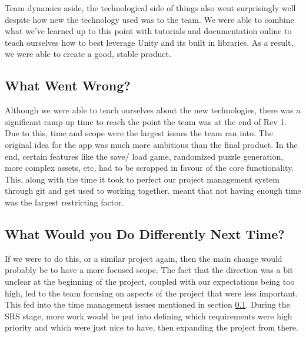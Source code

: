 \documentclass{article}
\begin{document}
Team dynamics aside, the technological side of things also went surprisingly well despite how new the technology used was to the team. We were able to combine what we've learned up to this point with tutorials and documentation online to teach ourselves how to best leverage Unity and its built in libraries. As a result, we were able to create a good, stable product. 

\subsection{What Went Wrong?} \label{Wrong}

Although we were able to teach ourselves about the new technologies, there was a significant ramp up time to reach the point the team was at the end of Rev 1. Due to this, time and scope were the largest issues the team ran into. The original idea for the app was much more ambitious than the final product. In the end, certain features like the save/ load game, randomized puzzle generation, more complex assets, etc, had to be scrapped in favour of the core functionality. This, along with the time it took to perfect our project management system through git and get used to working together, meant that not having enough time was the largest restricting factor.

\subsection{What Would you Do Differently Next Time?}

If we were to do this, or a similar project again, then the main change would probably be to have a more focused scope. The fact that the direction was a bit unclear at the beginning of the project, coupled with our expectations being too high, led to the team focusing on aspects of the project that were less important. This fed into the time management issues mentioned in section \ref{Wrong}. During the SRS stage, more work would be put into defining which requirements were high priority and which were just nice to have, then expanding the project from there.
\end{document}
